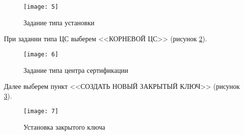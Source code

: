     \begin{figure}[h!]
        \centering
        \texttt{[image: 5]}
        \caption{Задание типа установки}
        \label{img:05}
    \end{figure}
    
    При задании типа ЦС выберем <<КОРНЕВОЙ ЦС>> (рисунок \ref{img:06}).\par
    
    \begin{figure}[h!]
        \centering
        \texttt{[image: 6]}
        \caption{Задание типа центра сертификации}
        \label{img:06}
    \end{figure}
    
    Далее выберем пункт <<СОЗДАТЬ НОВЫЙ ЗАКРЫТЫЙ КЛЮЧ>> (рисунок \ref{img:07}).\par

    \begin{figure}[h!]
        \centering
        \texttt{[image: 7]}
        \caption{Установка закрытого ключа}
        \label{img:07}
    \end{figure}
    